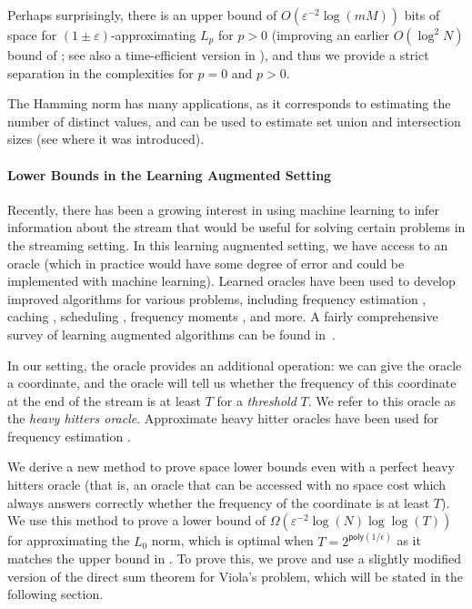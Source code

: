 \documentclass{toc}
\newcommand{\poly}{\mathsf{poly}}
\newcommand{\gap}{\ensuremath{\varepsilon}}
\newcommand{\bigo}[1]{\ensuremath{{{O} \left( {#1} \right)}}}
\newcommand{\bigomega}[1]{\ensuremath{{\Omega \left( {#1} \right)}}}
\begin{document}
Perhaps surprisingly, 
there is an upper bound of $\bigo{\gap^{-2}\log(mM)}$ bits of space for $(1\pm\gap)$-approximating
$L_p$ for $p>0$ \cite{knw10b}  (improving an earlier $\bigo{\log^2 N}$ bound of \cite{i06}; see also a time-efficient version in \cite{knpw11}), 
and thus we provide 
a strict separation in the complexities for $p = 0$ and $p > 0$. 

The Hamming norm has many applications, as it corresponds to estimating the number of distinct values, and can be used to estimate set union and intersection sizes (see \cite{CDIM03} where it was introduced).

\paragraph*{Lower Bounds in the Learning Augmented Setting}

Recently, there has been a growing interest in using machine learning to infer information about the stream that would be useful for solving certain problems in the streaming setting. In this learning augmented setting, we have access to an oracle (which in practice would have some degree of error and could be implemented with machine learning).  Learned oracles have been used to develop improved algorithms for various problems, including frequency estimation \cite{hsu2018learningbased}, caching \cite{lykouris2018competitive}, scheduling \cite{mitzenmacher_scheduling_2020}, frequency moments \cite{Jiang2020Learning-Augmented}, and more. A fairly comprehensive survey of learning augmented algorithms can be found %
in~\cite{DBLP:books/cu/20/MitzenmacherV20}.  %

In our setting, the oracle provides an additional operation: we can give the oracle a coordinate, and the oracle will tell us whether the frequency of this coordinate at the end of the stream is at least $T$ for a \emph{threshold} $T$. We refer to this oracle as the \emph{heavy hitters oracle}. Approximate heavy hitter oracles have been used for frequency estimation \cite{hsu2018learningbased}.

%
 We derive a new method %
%
%
to prove space lower bounds even with a perfect heavy hitters oracle {\color{black}(that is, an oracle that can be accessed with no space cost which always answers correctly whether the frequency of the coordinate is at least $T$)}. We use this method to prove a lower bound of $\bigomega{\gap^{-2}\log(N)\log\log(T)}$ for approximating the $L_0$ norm, which is optimal when $T = 2^{\poly(1/\epsilon)}$ as it matches the upper bound in \cite{Jiang2020Learning-Augmented}. {\color{black}To prove this, we prove and use a slightly modified version of the direct sum theorem for Viola's problem, which will be stated in the following section.}
\end{document}
